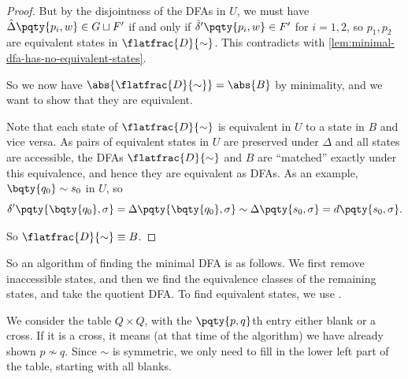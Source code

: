\begin{proof}
    But by the disjointness of the DFAs in \(U\), we must have \(\hat{\Delta} \pqty{p_i, w} \in G \sqcup F'\) if and only if \(\hat{\delta}' \pqty{p_i, w} \in F'\) for \(i = 1, 2\), so \(p_1, p_2\) are equivalent states in \(\flatfrac{D}{\sim}\). This contradicts with \autoref{lem:minimal-dfa-has-no-equivalent-states}.

    So we now have \(\abs{\flatfrac{D}{\sim}} = \abs{B}\) by minimality, and we want to show that they are equivalent.

    Note that each state of \(\flatfrac{D}{\sim}\) is equivalent in \(U\) to a state in \(B\) and vice versa. As pairs of equivalent states in \(U\) are preserved under \(\Delta\) and all states are accessible, the DFAs \(\flatfrac{D}{\sim}\) and \(B\) are ``matched'' exactly under this equivalence, and hence they are equivalent as DFAs. As an example, \(\bqty{q_0} \sim s_0\) in \(U\), so
    \[
        \delta'\pqty{\bqty{q_0}, \sigma} = \Delta\pqty{\bqty{q_0}, \sigma} \sim \Delta\pqty{s_0, \sigma} = d\pqty{s_0, \sigma}.
    \]

    So \(\flatfrac{D}{\sim} \equiv B\).
\end{proof}

So an algorithm of finding the minimal DFA is as follows. We first remove inaccessible states, and then we find the equivalence classes of the remaining states, and take the quotient DFA. To find equivalent states, we use .

We consider the table \(Q \times Q\), with the \(\pqty{p, q}\)th entry either blank or a cross. If it is a cross, it means (at that time of the algorithm) we have already shown \(p \nsim q\). Since \(\sim\) is symmetric, we only need to fill in the lower left part of the table, starting with all blanks.

